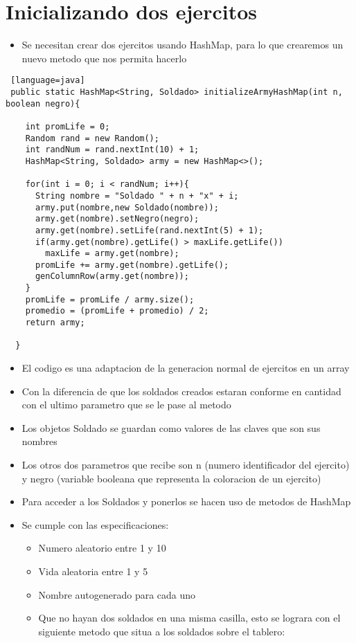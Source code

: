 \section{Inicializando dos ejercitos}
\begin{itemize}
  \item Se necesitan crear dos ejercitos usando HashMap, para lo que crearemos un nuevo metodo que nos permita hacerlo
\end{itemize}
\begin{lstlisting} [language=java]
 public static HashMap<String, Soldado> initializeArmyHashMap(int n, boolean negro){

    int promLife = 0;
    Random rand = new Random();
    int randNum = rand.nextInt(10) + 1;
    HashMap<String, Soldado> army = new HashMap<>();

    for(int i = 0; i < randNum; i++){
      String nombre = "Soldado " + n + "x" + i;
      army.put(nombre,new Soldado(nombre));
      army.get(nombre).setNegro(negro);
      army.get(nombre).setLife(rand.nextInt(5) + 1);
      if(army.get(nombre).getLife() > maxLife.getLife())
        maxLife = army.get(nombre);
      promLife += army.get(nombre).getLife();
      genColumnRow(army.get(nombre));
    }
    promLife = promLife / army.size();
    promedio = (promLife + promedio) / 2;
    return army;

  }
\end{lstlisting}
\begin{itemize}
  \item El codigo es una adaptacion de la generacion normal de ejercitos en un array
  \item Con la diferencia de que los soldados creados estaran conforme en cantidad con el ultimo parametro que se le pase al metodo
  \item Los objetos Soldado se guardan como valores de las claves que son sus nombres
  \item Los otros dos parametros que recibe son n (numero identificador del ejercito) y negro (variable booleana que representa la coloracion de un ejercito)
  \item Para acceder a los Soldados y ponerlos se hacen uso de metodos de HashMap
    \item Se cumple con las especificaciones:
      \begin{itemize}
        \item Numero aleatorio entre 1 y 10
          \item Vida aleatoria entre 1 y 5
            \item Nombre autogenerado para cada uno  
              \item Que no hayan dos soldados en una misma casilla, esto se lograra con el siguiente metodo que situa a los soldados sobre el tablero:
      \end{itemize}
\end{itemize}

